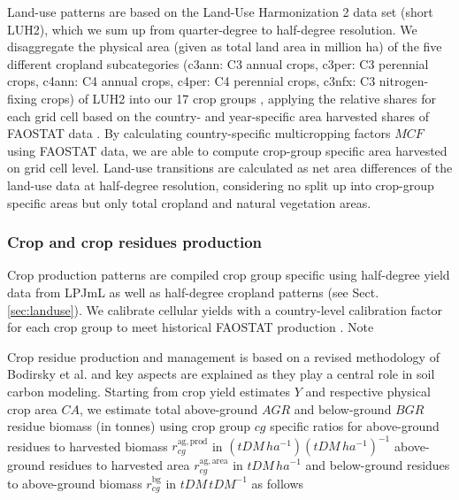 \documentclass[gc, manuscript]{copernicus}
\begin{document}
Land-use patterns are based on the Land-Use Harmonization 2 \citep{hurtt_harmonization_2020} data set (short LUH2), which we sum up from quarter-degree to half-degree resolution. We disaggregate the physical area (given as total land area in million ha) of the five different cropland subcategories (c3ann: C3 annual crops, c3per: C3 perennial crops, c4ann: C4 annual crops, c4per: C4 perennial crops, c3nfx: C3 nitrogen-fixing crops) of LUH2 into our 17 crop groups \citep[see Table ``FAO2LUH2MAG\_croptypes.csv'' in][]{karstens_model_2020}, applying the relative shares for each grid cell based on the country- and year-specific area harvested shares of FAOSTAT data \citep{faostat_faostat_2016}. By calculating country-specific multicropping factors \(MCF\) using FAOSTAT data, we are able to compute crop-group specific area harvested on grid cell level.
Land-use transitions are calculated as net area differences of the land-use data at half-degree resolution, considering no split up into crop-group specific areas but only total cropland and natural vegetation areas.

\hypertarget{sec:residues}{%
\subsubsection{Crop and crop residues production}\label{sec:residues}}

Crop production patterns are compiled crop group specific using half-degree yield data from LPJmL \citep{schaphoff_lpjml4_2018} as well as half-degree cropland patterns (see Sect. \ref{sec:landuse}). We calibrate cellular yields with a country-level calibration factor for each crop group to meet historical FAOSTAT production \citep{faostat_faostat_2016}. Note

Crop residue production and management is based on a revised methodology of Bodirsky et al. \citeyearpar{bodirsky_n2o_2012} and key aspects are explained as they play a central role in soil carbon modeling. Starting from crop yield estimates \(Y\) and respective physical crop area \(CA\), we estimate total above-ground \(AGR\) and below-ground \(BGR\) residue biomass (in tonnes) using crop group \(cg\) specific ratios for above-ground residues to harvested biomass \(r^{\mathrm{ag,prod}}_{cg}\) in \((tDM\,ha^{-1})(tDM\,ha^{-1})^{-1}\) above-ground residues to harvested area \(r^{\mathrm{ag,area}}_{cg}\) in \(\unit{tDM\,\unit{ha}^{-1}}\) and below-ground residues to above-ground biomass \(r^{\mathrm{bg}}_{cg}\) in \(\unit{tDM\,\unit{tDM}^{-1}}\) as follows
\end{document}

